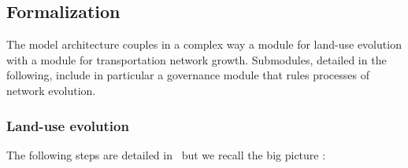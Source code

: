 \subsection{Formalization}


The model architecture couples in a complex way a module for land-use evolution with a module for transportation network growth. Submodules, detailed in the following, include in particular a governance module that rules processes of network evolution.


\subsubsection{Land-use evolution}

The following steps are detailed in~\cite{lenechet2012} but we recall the big picture :

